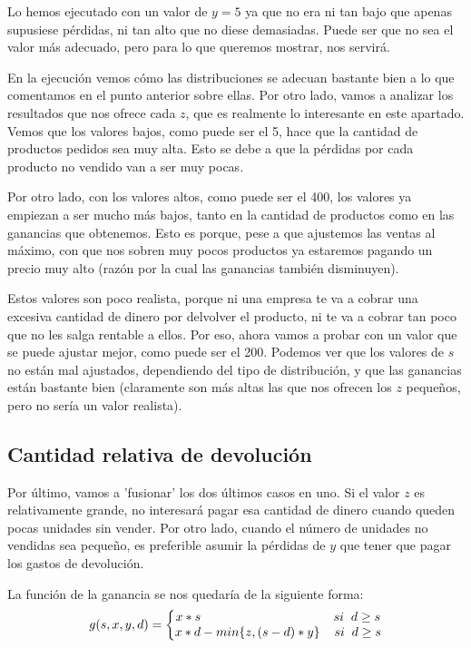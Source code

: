 \documentclass[11pt,a4paper]{report}
\begin{document}
Lo hemos ejecutado con un valor de $y=5$ ya que no era ni tan bajo que apenas supusiese pérdidas, ni tan alto que no diese demasiadas. Puede ser que
no sea el valor más adecuado, pero para lo que queremos mostrar, nos servirá.

En la ejecución vemos cómo las distribuciones se adecuan bastante bien a lo que comentamos en el punto anterior sobre ellas. Por otro lado, vamos a
analizar los resultados que nos ofrece cada $z$, que es realmente lo interesante en este apartado. Vemos que los valores bajos, como puede ser el 5,
hace que la cantidad de productos pedidos sea muy alta. Esto se debe a que la pérdidas por cada producto no vendido van a ser muy pocas.

Por otro lado, con los valores altos, como puede ser el 400, los valores ya empiezan a ser mucho más bajos, tanto en la cantidad de productos como en
las ganancias que obtenemos. Esto es porque, pese a que ajustemos las ventas al máximo, con que nos sobren muy pocos productos ya estaremos pagando un
precio muy alto (razón por la cual las ganancias también disminuyen).

Estos valores son poco realista, porque ni una empresa te va a cobrar una excesiva cantidad de dinero por delvolver el producto, ni te va a cobrar tan
poco que no les salga rentable a ellos. Por eso, ahora vamos a probar con un valor que se puede ajustar mejor, como puede ser el 200. Podemos ver que los
valores de $s$ no están mal ajustados, dependiendo del tipo de distribución, y que las ganancias están bastante bien (claramente son más altas las que nos
ofrecen los $z$ pequeños, pero no sería un valor realista).


\subsection{Cantidad relativa de devolución}

Por último, vamos a 'fusionar' los dos últimos casos en uno. Si el valor $z$ es relativamente grande, no interesará pagar esa cantidad
de dinero cuando queden pocas unidades sin vender. Por otro lado, cuando el número de unidades no vendidas sea pequeño, es preferible asumir
la pérdidas de $y$ que tener que pagar los gastos de devolución.

La función de la ganancia se nos quedaría de la siguiente forma:
\begin{equation}
	g(s,x,y,d)=\left\{\begin{matrix}
	x*s\hspace{37mm}si\hspace{2mm}d\geq s\\ 
	x*d-min\{z,(s-d)*y\}\hspace{4mm}si\hspace{2mm}d\geq s
	\end{matrix}\right.
\end{equation}
\end{document}
